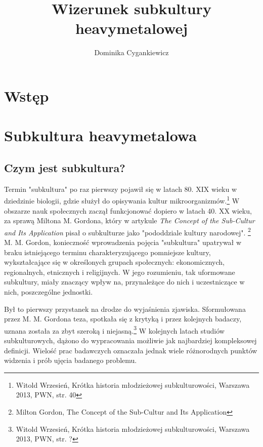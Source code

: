 \documentclass[12pt, a4paper, titlepage]{report}
\title{\textbf{Wizerunek subkultury heavymetalowej}}
\author{Dominika Cygankiewicz}
\date{}
\begin{document}
	
\maketitle
\tableofcontents
\thispagestyle {empty}
\newpage

\chapter*{Wstęp}

\chapter{Subkultura heavymetalowa}
\section{Czym jest subkultura?}
Termin "subkultura" po raz pierwszy pojawił się w latach 80. XIX wieku w dziedzinie biologii, gdzie służył do opisywania kultur mikroorganizmów.\footnote{Witold Wrzesień, Krótka historia młodzieżowej subkulturowości, Warszawa 2013, PWN, \break str. 40} W obszarze nauk społecznych zaczął funkcjonować dopiero w latach 40. XX wieku, za sprawą Miltona M. Gordona, który w artykule \textit{The Concept of the Sub-Cultur and Its Application} pisał o subkulturze jako "pododdziale kultury narodowej". \footnote{Milton Gordon, The Concept of the Sub-Cultur and Its Application} M. M. Gordon, konieczność wprowadzenia pojęcia "subkultura" upatrywał w braku istniejącego terminu charakteryzującego pomniejsze kultury, wykształcające się w określonych grupach społecznych: ekonomicznych, regionalnych, etnicznych i religijnych. W jego rozumieniu, tak uformowane subkultury, miały znaczący wpływ na, przynależące do nich i uczestniczące w nich, poszczególne jednostki.\footnotemark[\value{footnote}] %


Był to pierwszy przystanek na drodze do wyjaśnienia zjawiska. Sformułowana przez M. M. Gordona teza, spotkała się z krytyką i przez kolejnych badaczy, uznana została za zbyt szeroką i niejasną.\footnote{Witold Wrzesień, Krótka historia młodzieżowej subkulturowości, Warszawa 2013, PWN, \break str. ?} W kolejnych latach studiów subkulturowych, dążono do wypracowania możliwie jak najbardziej kompleksowej definicji. Wielość prac badawczych oznaczała jednak wiele różnorodnych punktów widzenia i prób ujęcia badanego problemu. %
\end{document}
